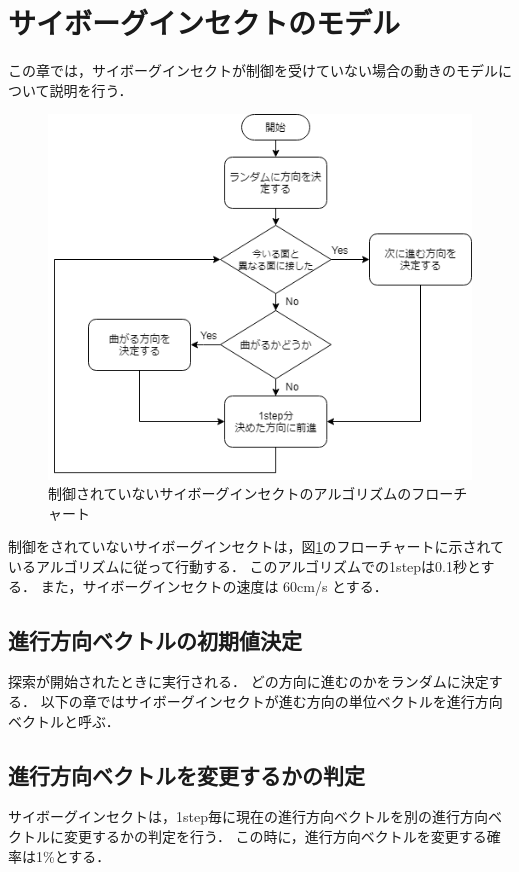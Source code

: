 \documentclass[a4paper,11pt]{jarticle}
\begin{document}
	\section{サイボーグインセクトのモデル}
	\label{sec:algorithm}
	この章では，サイボーグインセクトが制御を受けていない場合の動きのモデルについて説明を行う．
	\begin{figure}
		\centering
		\includegraphics[width=0.5\linewidth]{png/Untitled.png}
		\caption[アルゴリズムのフローチャート]{制御されていないサイボーグインセクトのアルゴリズムのフローチャート}
		\label{fig:algorithm}
	\end{figure}
	
	制御をされていないサイボーグインセクトは，図\ref{fig:algorithm}のフローチャートに示されているアルゴリズムに従って行動する．
	このアルゴリズムでの1stepは0.1秒とする．
	また，サイボーグインセクトの速度は 60cm/s とする\cite{speed}．
	
	\subsection{進行方向ベクトルの初期値決定}
	\label{random}
	探索が開始されたときに実行される．
	どの方向に進むのかをランダムに決定する．
	以下の章ではサイボーグインセクトが進む方向の単位ベクトルを進行方向ベクトルと呼ぶ．
		
	\subsection{進行方向ベクトルを変更するかの判定}
	\label{carb}
	サイボーグインセクトは，1step毎に現在の進行方向ベクトルを別の進行方向ベクトルに変更するかの判定を行う．
	この時に，進行方向ベクトルを変更する確率は1\%とする．
	
\end{document}
